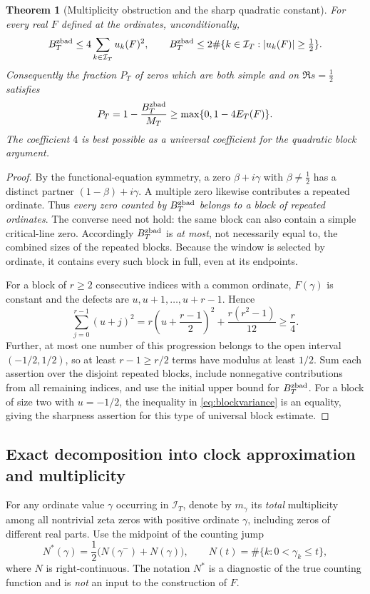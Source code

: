 \documentclass[11pt,reqno]{amsart}
\numberwithin{equation}{section}
\newtheorem{theorem}{Theorem}[section]
\begin{document}
\begin{theorem}[Multiplicity obstruction and the sharp quadratic constant]
\label{thm:blockcount}
For every real $F$ defined at the ordinates, unconditionally,
\begin{equation}\label{eq:blockmain}
  B_T^{\rm zbad}\le4\sum_{k\in\mathcal I_T}u_k(F)^2,
  \qquad
  B_T^{\rm zbad}\le2\#\{k\in\mathcal I_T:|u_k(F)|\ge\tfrac12\}.
\end{equation}
Consequently the fraction $P_T$ of zeros which are both simple and on
$\Re s=\tfrac12$ satisfies
\begin{equation}\label{eq:blockfraction}
 P_T=1-\frac{B_T^{\rm zbad}}{M_T}\ge
 \max\{0,1-4E_T(F)\}.
\end{equation}
The coefficient $4$ is best possible as a universal coefficient for the
quadratic block argument.
\end{theorem}
\begin{proof}
By the functional-equation symmetry, a zero
$\beta+i\gamma$ with $\beta\ne\tfrac12$ has a distinct partner
$(1-\beta)+i\gamma$.  A multiple zero likewise contributes a repeated
ordinate. Thus \emph{every zero counted by $B_T^{\rm zbad}$ belongs to a block of
repeated ordinates}.  The converse need not hold: the same block can also
contain a simple critical-line zero. Accordingly $B_T^{\rm zbad}$ is \emph{at most},
not necessarily equal to, the combined sizes of the repeated blocks.
Because the window is selected by ordinate, it contains every such block
in full, even at its endpoints.

For a block of $r\ge2$ consecutive indices with a common ordinate,
$F(\gamma)$ is constant and the defects are $u,u+1,\dots,u+r-1$. Hence
\begin{equation}\label{eq:blockvariance}
\sum_{j=0}^{r-1}(u+j)^2
=r\left(u+\frac{r-1}{2}\right)^2+\frac{r(r^2-1)}{12}
\ge\frac r4.
\end{equation}
Further, at most one number of this progression belongs to the open
interval $(-1/2,1/2)$, so at least $r-1\ge r/2$ terms have modulus at
least $1/2$.  Sum each assertion over the disjoint repeated blocks,
include nonnegative contributions from all remaining indices, and use
the initial upper bound for $B_T^{\rm zbad}$.
For a block of size two with $u=-1/2$, the inequality in
\eqref{eq:blockvariance} is an equality, giving the sharpness assertion
for this type of universal block estimate.
\end{proof}


\subsection{Exact decomposition into clock approximation and multiplicity}
\label{subsec:variance-split}
For any ordinate value $\gamma$ occurring in $\mathcal I_T$, denote by
$m_\gamma$ its \emph{total} multiplicity among all nontrivial zeta zeros
with positive ordinate $\gamma$, including zeros of different real parts.
Use the midpoint of the counting jump
\[
 N^*(\gamma)=\frac12\bigl(N(\gamma^-)+N(\gamma)\bigr),
 \qquad N(t)=\#\{k:0<\gamma_k\le t\},
\]
where $N$ is right-continuous.  The notation $N^*$ is a diagnostic of
the true counting function and is \emph{not} an input to the construction
of $F$.
\end{document}
